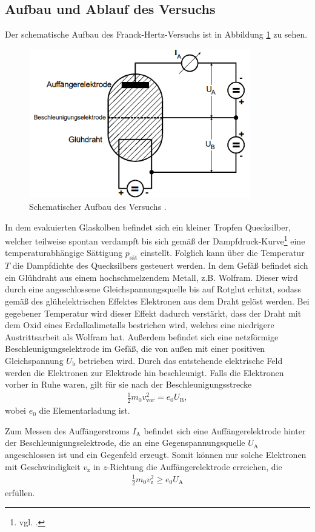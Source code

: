 \subsection{Aufbau und Ablauf des Versuchs}
Der schematische Aufbau des Franck-Hertz-Versuchs ist in Abbildung \ref{fig:schematischer_aufbau} zu sehen.
\begin{figure}[H]
    \centering
    \includegraphics[height = 6.5cm]{bilder/schema.png}
    \caption{Schematischer Aufbau des Versuchs \cite{man:v601}.}
    \label{fig:schematischer_aufbau}
\end{figure}
\noindent
In dem evakuierten Glaskolben befindet sich ein kleiner Tropfen Quecksilber, welcher teilweise spontan verdampft bis sich gemäß der 
Dampfdruck-Kurve\footnote{vgl. \cite{man:v203}.} eine temperaturabhängige Sättigung $p_\text{sät}$ einstellt.
Folglich kann über die Temperatur $T$ die Dampfdichte des Quecksilbers gesteuert werden.
In dem Gefäß befindet sich ein Glühdraht aus einem hochschmelzendem Metall, z.B. Wolfram.
Dieser wird durch eine angeschlossene Gleichspannungsquelle bis auf Rotglut erhitzt, 
sodass gemäß des glühelektrischen Effektes Elektronen aus dem Draht gelöst werden.
Bei gegebener Temperatur wird dieser Effekt dadurch verstärkt, dass der Draht mit dem Oxid eines Erdalkalimetalls bestrichen wird,
welches eine niedrigere Austrittsarbeit als Wolfram hat.
Außerdem befindet sich eine netzförmige Beschleunigungselektrode im Gefäß, die von außen mit einer positiven Gleichspannung $U_\text{b}$
betrieben wird.
Durch das entstehende elektrische Feld werden die Elektronen zur Elektrode hin beschleunigt.
Falls die Elektronen vorher in Ruhe waren, gilt für sie nach der Beschleunigungsstrecke
\begin{align}
    \frac{1}{2} m_0 v^2_\text{vor} = e_0 U_\text{B}, 
    \label{eq:beschleunigung}
\end{align}
\noindent wobei $e_0$ die Elementarladung ist.

\noindent
Zum Messen des Auffängerstroms $I_\text{A}$ befindet sich eine Auffängerelektrode hinter der Beschleunigungselektrode,
die an eine Gegenspannungsquelle $U_\text{A}$ angeschlossen ist und ein Gegenfeld erzeugt.
Somit können nur solche Elektronen mit Geschwindigkeit $v_\text{z}$ in $z$-Richtung die Auffängerelektrode erreichen, die 
\begin{align}
    \frac{1}{2} m_0 v^2_\text{z} \geq e_0 U_\text{A}
\end{align}
erfüllen.

